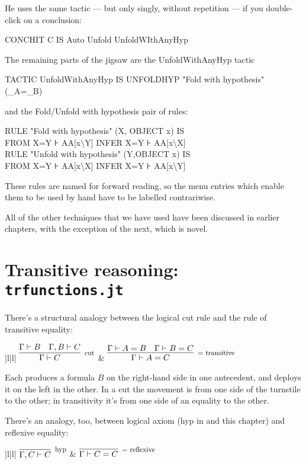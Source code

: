He uses the same tactic --- but only singly, without repetition --- if you double-click on a conclusion:
\begin{japeish}
CONCHIT C IS Auto Unfold UnfoldWIthAnyHyp
\end{japeish}

The remaining parts of the jigsaw are the UnfoldWithAnyHyp tactic
\begin{japeish}
TACTIC UnfoldWithAnyHyp IS UNFOLDHYP "Fold with hypothesis" (\_A=\_B)
\end{japeish}
and the Fold/Unfold with hypothesis pair of rules:
\begin{japeish}
RULE "Fold with hypothesis" (X, OBJECT x) IS \\
\tab\tab FROM X=Y ⊦ AA[x{\textbackslash}Y] INFER X=Y ⊦ AA[x{\textbackslash}X]\\
RULE "Unfold with hypothesis" (Y,OBJECT x) IS \\
\tab\tab FROM X=Y ⊦ AA[x{\textbackslash}X] INFER X=Y ⊦ AA[x{\textbackslash}Y]
\end{japeish}
These rules are named for forward reading, so the menu entries which enable them to be used by hand have to be labelled contrariwise.

All of the other techniques that we have used have been discussed in earlier chapters, with the exception of the next, which is novel.

\section{Transitive reasoning: \texttt{trfunctions.jt}} 

There's a structural analogy between the logical cut rule and the rule of transitive equality:
\begin{ruletab}{|l|l|}
\hline
$\infer[\reason{cut}]
       {\Gamma|-C}
       {\Gamma|-B & \Gamma,B|-C}$
&
$\infer[\reason{$=$ transitive}]
       {\Gamma|-A=C}
       {\Gamma|-A=B & \Gamma|-B=C}$\\
\hline
\end{ruletab}
Each produces a formula $B$ on the right-hand side in one antecedent, and deploys it on the left in the other. In a cut the movement is from one side of the turnstile to the other; in transitivity it's from one side of an equality to the other.

There's an analogy, too, between logical axiom (hyp in  and this chapter) and reflexive equality:
\begin{ruletab}{|l|l|}
\hline
$\infer[\reason{hyp}]
       {\Gamma,C|-C}
       {}$
&
$\infer[\reason{$=$ reflexive}]
       {\Gamma|-C=C}
       {}$\\
\hline
\end{ruletab}

